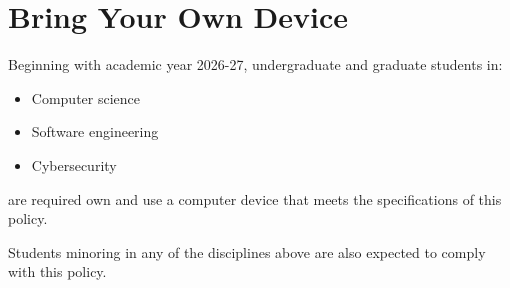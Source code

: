 \section{Bring Your Own Device}

Beginning with academic year 2026-27, undergraduate and graduate students in:

\begin{itemize}
    \item Computer science
    \item Software engineering
    \item Cybersecurity
\end{itemize}
%
are required own and use a computer device that meets the specifications of this policy.

Students minoring in any of the disciplines above are also expected to comply with this policy.